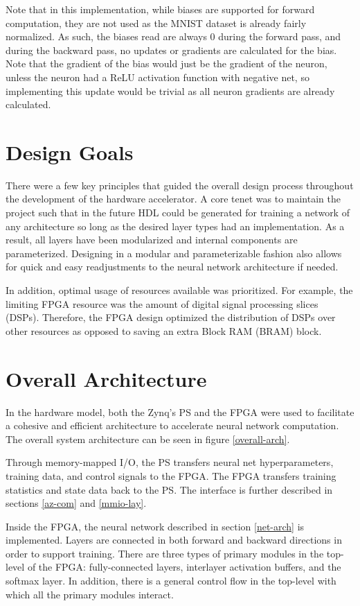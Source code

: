 Note that in this implementation, while biases are supported for forward computation, they are not used as the MNIST dataset is already fairly normalized. As such, the biases read are always 0 during the forward pass, and during the backward pass, no updates or gradients are calculated for the bias. Note that the gradient of the bias would just be the gradient of the neuron, unless the neuron had a ReLU activation function with negative net, so implementing this update would be trivial as all neuron gradients are already calculated. 


\section{Design Goals}
There were a few key principles that guided the overall design process throughout the development of the hardware accelerator. A core tenet was to maintain the project such that in the future HDL could be generated for training a network of any architecture so long as the desired layer types had an implementation. As a result, all layers have been modularized and internal components are parameterized. Designing in a modular and parameterizable fashion also allows for quick and easy readjustments to the neural network architecture if needed.
\par 
In addition, optimal usage of resources available was prioritized. For example, the limiting FPGA resource was the amount of digital signal processing slices (DSPs). Therefore, the FPGA design optimized the distribution of DSPs over other resources as opposed to saving an extra Block RAM (BRAM) block. 

\section{Overall Architecture}
In the hardware model, both the Zynq's PS and the FPGA were used to facilitate a cohesive and efficient architecture to accelerate neural network computation. The overall system architecture can be seen in figure \ref{overall-arch}. 

Through memory-mapped I/O, the PS transfers neural net hyperparameters, training data, and control signals to the FPGA. The FPGA transfers training statistics and state data back to the PS. The interface is further described in sections \ref{az-com} and \ref{mmio-lay}.

Inside the FPGA, the neural network described in section \ref{net-arch} is implemented. Layers are connected in both forward and backward directions in order to support training. There are three types of primary modules in the top-level of the FPGA: fully-connected layers, interlayer activation buffers, and the softmax layer. In addition, there is a general control flow in the top-level with which all the primary modules interact.


